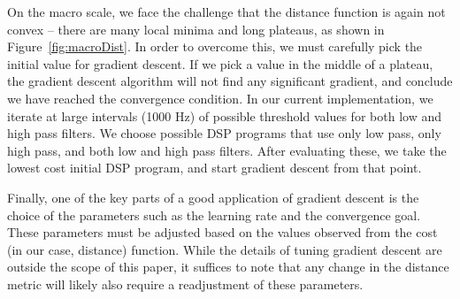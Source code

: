 On the macro scale, we face the challenge that the distance function is again not convex -- there are many local minima and long plateaus, as shown in Figure~\ref{fig:macroDist}.
In order to overcome this, we must carefully pick the initial value for gradient descent.
If we pick a value in the middle of a plateau, the gradient descent algorithm will not find any significant gradient, and conclude we have reached the convergence condition.
In our current implementation, we iterate at large intervals (1000 Hz) of possible threshold values for both low and high pass filters.
We choose possible DSP programs that use only low pass, only high pass, and both low and high pass filters.
After evaluating these, we take the lowest cost initial DSP program, and start gradient descent from that point.

Finally, one of the key parts of a good application of gradient descent is the choice of the parameters such as the learning rate and the convergence goal.
These parameters must be adjusted based on the values observed from the cost (in our case, distance) function.
While the details of tuning gradient descent are outside the scope of this paper, it suffices to note that any change in the distance metric will likely also require a readjustment of these parameters.

